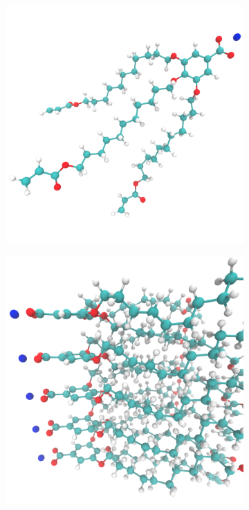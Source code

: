 \documentclass[journal=jpcbfk,manuscript=article]{achemso}
\begin{document}
  \begin{figure}[!htb]
  \centering
  \begin{subfigure}[t]{0.45\textwidth}
  \includegraphics[width=\linewidth]{monomer_diagonal.pdf}
  \caption{}
  \end{subfigure}
  \begin{subfigure}[t]{0.42\textwidth}
  \includegraphics[width=\linewidth]{stacked_monomers.pdf}

\end{subfigure}
\end{figure}
\end{document}
